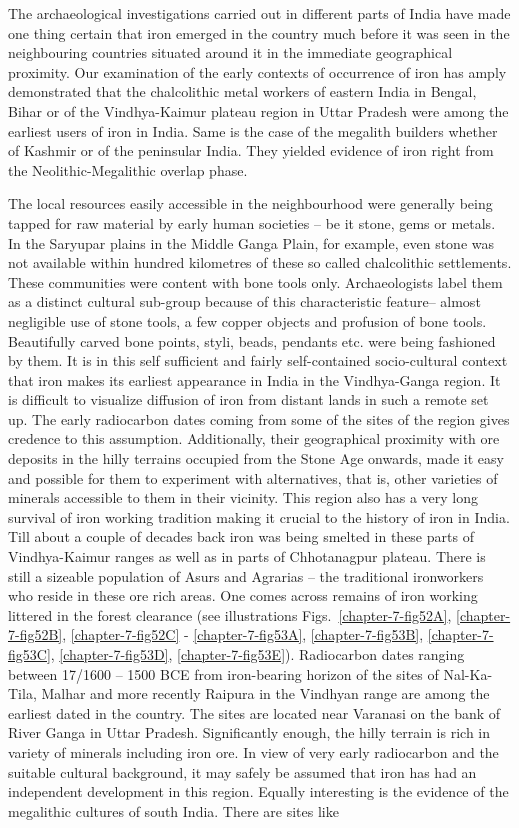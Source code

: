 The archaeological investigations carried out in different parts of India have made one thing certain that iron emerged in the country much before it was seen in the neighbouring countries situated around it in the immediate geographical proximity. Our examination of the early contexts of occurrence of iron has amply demonstrated that the chalcolithic metal workers of eastern India in Bengal, Bihar or of the Vindhya-Kaimur plateau region in Uttar Pradesh were among the earliest users of iron in India. Same is the case of the megalith builders whether of Kashmir or of the peninsular India. They yielded evidence of iron right from the Neolithic-Megalithic overlap phase.

The local resources easily accessible in the neighbourhood were generally being tapped for raw material by early human societies – be it stone, gems or metals. In the Saryupar plains in the Middle Ganga Plain, for example, even stone was not available within hundred kilometres of these so called chalcolithic settlements. These communities were content with bone tools only. Archaeologists label them as a distinct cultural sub-group because of this characteristic feature– almost negligible use of stone tools, a few copper objects and profusion of bone tools. Beautifully carved bone points, styli, beads, pendants etc. were being fashioned by them. It is in this self sufficient and fairly self-contained socio-cultural context that iron makes its earliest appearance in India in the Vindhya-Ganga region. It is difficult to visualize diffusion of iron from distant lands in such a remote set up. The early radiocarbon dates coming from some of the sites of the region gives credence to this assumption. Additionally, their geographical proximity with ore deposits in the hilly terrains occupied from the Stone Age onwards, made it easy and possible for them to experiment with alternatives, that is, other varieties of minerals accessible to them in their vicinity. This region also has a very long survival of iron working tradition making it crucial to the history of iron in India. Till about a couple of decades back iron was being smelted in these parts of Vindhya-Kaimur ranges as well as in parts of Chhotanagpur plateau. There is still a sizeable population of Asurs and Agrarias – the traditional ironworkers who reside in these ore rich areas. One comes across remains of iron working littered in the forest clearance (see illustrations Figs.~\ref{chapter-7-fig52A}, \ref{chapter-7-fig52B}, \ref{chapter-7-fig52C} - \ref{chapter-7-fig53A}, \ref{chapter-7-fig53B}, \ref{chapter-7-fig53C}, \ref{chapter-7-fig53D}, \ref{chapter-7-fig53E}). Radiocarbon dates ranging between 17/1600 – 1500 BCE from iron-bearing horizon of the sites of Nal-Ka-Tila,  Malhar and more recently Raipura in the Vindhyan range are among the earliest dated in the country. The sites are located near Varanasi on the bank of River Ganga in Uttar Pradesh. Significantly enough, the hilly terrain is rich in variety of minerals including iron ore. In view of very early radiocarbon and the suitable cultural background, it may safely be assumed that iron has had an independent development in this region. Equally interesting is the evidence of the megalithic cultures of south India. There are sites like 